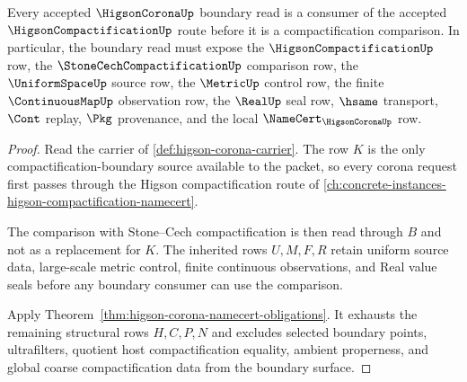 \begin{theorem}
\label{thm:higson-corona-compactification-boundary}
Every accepted $\HigsonCoronaUp$ boundary read is a consumer of the accepted $\HigsonCompactificationUp$ route before it is a compactification comparison. In particular, the boundary read must expose the $\HigsonCompactificationUp$ row, the $\StoneCechCompactificationUp$ comparison row, the $\UniformSpaceUp$ source row, the $\MetricUp$ control row, the finite $\ContinuousMapUp$ observation row, the $\RealUp$ seal row, $\hsame$ transport, $\Cont$ replay, $\Pkg$ provenance, and the local $\NameCert_{\HigsonCoronaUp}$ row.
\end{theorem}
\begin{proof}
Read the carrier of \autoref{def:higson-corona-carrier}. The row $K$ is the only compactification-boundary source available to the packet, so every corona request first passes through the Higson compactification route of \autoref{ch:concrete-instances-higson-compactification-namecert}.

The comparison with Stone--Cech compactification is then read through $B$ and not as a replacement for $K$. The inherited rows $U,M,F,R$ retain uniform source data, large-scale metric control, finite continuous observations, and Real value seals before any boundary consumer can use the comparison.

Apply Theorem~\ref{thm:higson-corona-namecert-obligations}. It exhausts the remaining structural rows $H,C,P,N$ and excludes selected boundary points, ultrafilters, quotient host compactification equality, ambient properness, and global coarse compactification data from the boundary surface.
\end{proof}



